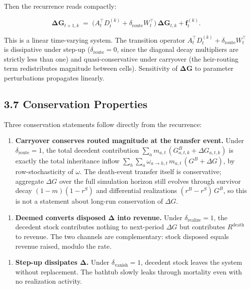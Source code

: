\documentclass[11pt]{article}
\begin{document}
Then the recurrence reads compactly:

\[
\boldsymbol{\Delta G}_{t+1, k}
\;=\;
\big(A_t^\top D_t^{(k)} + \delta_{\text{route}} W_t^\top\big)\,\boldsymbol{\Delta G}_{t, k}
+ \boldsymbol{f}_{t}^{(k)}.
\]

This is a linear time-varying system. The transition operator $A_t^\top D_t^{(k)} + \delta_{\text{route}} W_t^\top$ is dissipative under step-up ($\delta_{\text{route}} = 0$, since the diagonal decay multipliers are strictly less than one) and quasi-conservative under carryover (the heir-routing term redistributes magnitude between cells). Sensitivity of $\boldsymbol{\Delta G}$ to parameter perturbations propagates linearly.

\subsection*{3.7 Conservation Properties}

Three conservation statements follow directly from the recurrence:

\begin{enumerate}
  \item \textbf{Carryover conserves routed magnitude at the transfer event.} Under
    $\delta_{\text{route}} = 1$, the total decedent contribution $\sum_a
   m_{a,t}\,(G^B_{a,t,k} + \Delta G_{a,t,k})$ is exactly the total
    inheritance inflow $\sum_h \sum_a \omega_{a \to h, t}\,m_{a,t}\,(G^B +
   \Delta G)$, by row-stochasticity of $\omega$. The death-event transfer
    itself is conservative; aggregate $\Delta G$ over the full simulation
    horizon still evolves through survivor decay $(1 - m)(1 - r^S)$ and
    differential realizations $(r^B - r^S)\,G^B$, so this is not a statement
    about long-run conservation of $\Delta G$.
\end{enumerate}
\begin{enumerate}
  \item \textbf{Deemed converts disposed Δ into revenue.} Under $\delta_{\text{realize}}
   = 1$, the decedent stock contributes nothing to next-period $\Delta G$
    but contributes $R^{\text{death}}$ to revenue. The two channels are
    complementary: stock disposed equals revenue raised, modulo the rate.
\end{enumerate}
\begin{enumerate}
  \item \textbf{Step-up dissipates Δ.} Under $\delta_{\text{vanish}} = 1$, decedent
    stock leaves the system without replacement. The bathtub slowly leaks
    through mortality even with no realization activity.
\end{enumerate}
\end{document}
